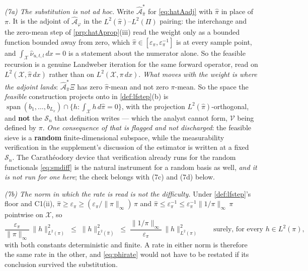 \begin{remark}
\emph{(7a) The substitution is not ad hoc.} Write $\hat{\mathcal A}^\ast_{\hat\pi}$ for
\eqref{eq:hatAadj} with $\hat\pi$ in place of $\pi$. It is the adjoint of
$\hat{\mathcal A}_\varphi$ in the $L^{2}(\hat\pi)$--$L^{2}(\Pi)$ pairing: the interchange and the
zero-mean step of \cref{prp:hatAprop}\textup{(iii)} read the weight only as a bounded function bounded
away from zero, which $\hat\pi\in[\varepsilon_\pi,\varepsilon_\pi^{-1}]$ is at every sample point, and
$\int_{\mathcal X}\hat\nu_{u,t,l}\,dx=0$ is a statement about the numerator alone. So the feasible
recursion is a genuine Landweber iteration for the same forward operator, read on
$L^{2}(\mathcal X,\hat\pi\,dx)$ rather than on $L^{2}(\mathcal X,\pi\,dx)$. \emph{What moves with the
weight is where the adjoint lands}: $\hat{\mathcal A}^\ast_{\hat\pi}\Xi$ has zero $\hat\pi$-mean and not
zero $\pi$-mean. So the space the \emph{feasible} construction projects onto in
\cref{def:lfstep}\textup{(b)} is
$\operatorname{span}(b_1,\dots,b_{L_x})\cap\{h:\int_{\mathcal X} h\,d\hat\pi=0\}$, with the projection
$L^{2}(\hat\pi)$-orthogonal, and \textbf{not} the $\mathcal S_n$ that definition writes --- which the
analyst cannot form, $\mathcal V$ being defined by $\pi$. \emph{One consequence of that is flagged and
not discharged}: the feasible sieve is a \textbf{random} finite-dimensional subspace, while the
measurability verification in the supplement's discussion of the estimator is written at a fixed
$\mathcal S_n$. The Carath\'eodory device that verification already runs for the random functionals
\eqref{eq:smdiff} is the natural instrument for a random basis as well, \emph{and it is not run for one
here}; the check belongs with \textup{(7c)} and \textup{(7d)} below.

\emph{(7b) The norm in which the rate is read is not the difficulty.} Under \cref{def:lfstep}'s floor and
C1(ii), $\hat\pi\ge\varepsilon_\pi\ge(\varepsilon_\pi/\|\pi\|_\infty)\,\pi$ and
$\hat\pi\le\varepsilon_\pi^{-1}\le\varepsilon_\pi^{-1}\|1/\pi\|_\infty\,\pi$ pointwise on $\mathcal X$,
so
\[
\frac{\varepsilon_\pi}{\|\pi\|_\infty}\,\|h\|^{2}_{L^{2}(\pi)}
\;\le\;\|h\|^{2}_{L^{2}(\hat\pi)}\;\le\;
\frac{\|1/\pi\|_\infty}{\varepsilon_\pi}\,\|h\|^{2}_{L^{2}(\pi)}
\qquad\text{surely, for every }h\in L^{2}(\pi),
\]
with both constants deterministic and finite. A rate in either norm is therefore the same rate in the
other, and \eqref{eq:phirate} would not have to be restated if its conclusion survived the substitution.


\end{remark}
